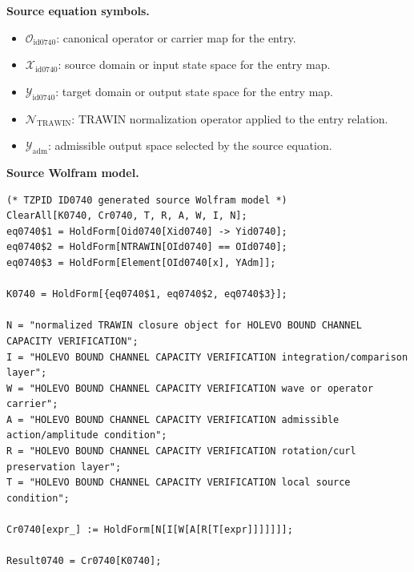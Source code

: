 \begin{minipage}[t]{0.49\linewidth}
\begingroup
\small
\raggedright
\textbf{Source equation symbols.}\par
\begin{itemize}[leftmargin=1.35em,itemsep=1pt,topsep=1pt,parsep=0pt]
    \item $\mathcal{O}_{\mathrm{id0740}}$: canonical operator or carrier map for the entry.
    \item $\mathcal{X}_{\mathrm{id0740}}$: source domain or input state space for the entry map.
    \item $\mathcal{Y}_{\mathrm{id0740}}$: target domain or output state space for the entry map.
    \item $\mathcal{N}_{\mathrm{TRAWIN}}$: TRAWIN normalization operator applied to the entry relation.
    \item $\mathcal{Y}_{\mathrm{adm}}$: admissible output space selected by the source equation.
\end{itemize}
\endgroup
\end{minipage}\hfill
\begin{minipage}[t]{0.47\linewidth}
\begingroup
\scriptsize
\raggedright
\textbf{Source Wolfram model.}\par
\begin{Verbatim}[fontsize=\tiny,breaklines=true,breakanywhere=true]
(* TZPID ID0740 generated source Wolfram model *)
ClearAll[K0740, Cr0740, T, R, A, W, I, N];
eq0740$1 = HoldForm[Oid0740[Xid0740] -> Yid0740];
eq0740$2 = HoldForm[NTRAWIN[OId0740] == OId0740];
eq0740$3 = HoldForm[Element[OId0740[x], YAdm]];

K0740 = HoldForm[{eq0740$1, eq0740$2, eq0740$3}];

N = "normalized TRAWIN closure object for HOLEVO BOUND CHANNEL CAPACITY VERIFICATION";
I = "HOLEVO BOUND CHANNEL CAPACITY VERIFICATION integration/comparison layer";
W = "HOLEVO BOUND CHANNEL CAPACITY VERIFICATION wave or operator carrier";
A = "HOLEVO BOUND CHANNEL CAPACITY VERIFICATION admissible action/amplitude condition";
R = "HOLEVO BOUND CHANNEL CAPACITY VERIFICATION rotation/curl preservation layer";
T = "HOLEVO BOUND CHANNEL CAPACITY VERIFICATION local source condition";

Cr0740[expr_] := HoldForm[N[I[W[A[R[T[expr]]]]]]];

Result0740 = Cr0740[K0740];
\end{Verbatim}
\endgroup
\end{minipage}

